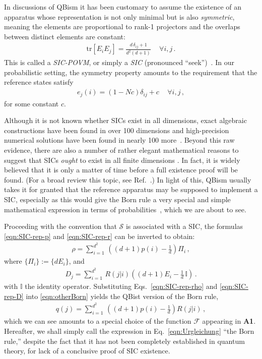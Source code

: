 \documentclass[%
 reprint,superscriptaddress,
 amsmath,amssymb,
 aps,twocolumn,pra
]{revtex4-1}
\newcommand{\eqn}[1]{\begin{eqnarray} #1 \end{eqnarray}}
\newcommand{\tit}[1]{\textit{#1}}
\newcommand{\tr}[1]{  \textrm{tr}\left[ #1 \right]  }
\newcommand{\zum}[2]{\displaystyle\sum_{#1}^{#2}}
\begin{document}
In discussions of QBism it has been customary to assume the existence of an apparatus whose representation is not only minimal but is also \tit{symmetric}, meaning the elements are proportional to rank-1 projectors and the overlaps between distinct elements are constant:
\eqn{
\tr{E_i E_j} = \frac{d \, \delta_{ij} + 1}{d^2(d+1)} \, \quad  \forall i, j \, .
}
This is called a \tit{SIC-POVM}, or simply a \tit{SIC} (pronounced ``seek'')~\cite{ZAUNER_PHD,RENES04}. In our probabilistic setting, the symmetry property amounts to the requirement that the reference states satisfy
\eqn{ \label{eqn:prob_symmetry}
e_j(i) = (1-Nc) \delta_{ij} + c \, \quad  \forall i, j \, ,
}
for some constant $c$.

Although it is not known whether SICs exist in all dimensions, exact algebraic constructions have been found in over 100 dimensions and high-precision numerical solutions have been found in nearly 100 more~\cite{Grassl20}.  Beyond this raw evidence, there are also a number of rather elegant mathematical reasons to suggest that SICs \tit{ought} to exist in all finite dimensions \cite{Appleby11,Appleby15,Appleby17,Bengtsson20,DeBrota20d,Pandey20}.  In fact, it is widely believed that it is only a matter of time before a full existence proof will be found.  (For a broad review this topic, see Ref.\ \cite{SIC_REVIEW}.) In light of this, QBism usually takes it for granted that the reference apparatus may be supposed to implement a SIC, especially as this would give the Born rule a very special and simple mathematical expression in terms of probabilities~\cite{DeBrota20b,Fuchs2017}, which we are about to see.

Proceeding with the convention that $\mathcal{S}$ is associated with a SIC, the formulas \eqref{eqn:SIC-rep-p} and \eqref{eqn:SIC-rep-r} can be inverted to obtain:
\eqn{ \label{eqn:SIC-rep-rho}
\rho = \zum{i=1}{d^2}\, \left((d+1)p(i)-\frac{1}{d} \right) \Pi_i \, ,
}
where $\{ \Pi_i \} := \{ d E_i\}$, and
\eqn{ \label{eqn:SIC-rep-D}
D_j = \zum{i=1}{d^2}\, R(j|i)\left((d+1)E_i-\frac{1}{d}\, \mathbb{I} \right) \, .
}
with $\mathbb{I}$ the identity operator. Substituting Eqs.\ \eqref{eqn:SIC-rep-rho} and \eqref{eqn:SIC-rep-D} into \eqref{eqn:otherBorn} yields the QBist version of the Born rule,
\eqn{ \label{eqn:Urgleichung}
q(j) = \zum{i=1}{d^2}\, \left( (d+1)p(i)-\frac{1}{d} \right) R(j|i) \, ,
}
which we can see amounts to a special choice of the function $\mathcal{F}$ appearing in {\bf A1}. Hereafter, we shall simply call the expression in Eq.\ \eqref{eqn:Urgleichung} ``the Born rule,'' despite the fact that it has not been completely established in quantum theory, for lack of a conclusive proof of SIC existence.
\end{document}
